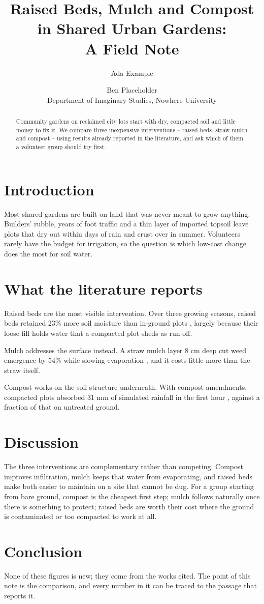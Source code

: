 \documentclass[11pt]{article}
\title{Raised Beds, Mulch and Compost in Shared Urban Gardens:\\ A Field Note}
\author{Ada Example \and Ben Placeholder\\[2pt]
  \small Department of Imaginary Studies, Nowhere University}
\date{}
\begin{document}
\maketitle

\begin{abstract}
Community gardens on reclaimed city lots start with dry, compacted soil and
little money to fix it. We compare three inexpensive interventions --
raised beds, straw mulch and compost -- using results already reported in the
literature, and ask which of them a volunteer group should try first.
\end{abstract}

\section{Introduction}
Most shared gardens are built on land that was never meant to grow anything.
Builders' rubble, years of foot traffic and a thin layer of imported topsoil
leave plots that dry out within days of rain and crust over in summer.
Volunteers rarely have the budget for irrigation, so the question is which
low-cost change does the most for soil water.

\section{What the literature reports}
Raised beds are the most visible intervention. Over three growing seasons,
raised beds retained 23\% more soil moisture than in-ground plots
\cite{example2021beds}, largely because their loose fill holds water that a
compacted plot sheds as run-off.

Mulch addresses the surface instead. A straw mulch layer 8 cm deep cut weed
emergence by 54\% while slowing evaporation \cite{placeholder2019mulch}, and
it costs little more than the straw itself.

Compost works on the soil structure underneath. With compost amendments,
compacted plots absorbed 31 mm of simulated rainfall in the first hour
\cite{testwell2022compost}, against a fraction of that on untreated ground.

\section{Discussion}
The three interventions are complementary rather than competing. Compost
improves infiltration, mulch keeps that water from evaporating, and raised
beds make both easier to maintain on a site that cannot be dug. For a group
starting from bare ground, compost is the cheapest first step; mulch follows
naturally once there is something to protect; raised beds are worth their cost
where the ground is contaminated or too compacted to work at all.

\section{Conclusion}
None of these figures is new; they come from the works cited. The point of
this note is the comparison, and every number in it can be traced to the
passage that reports it.



\end{document}
